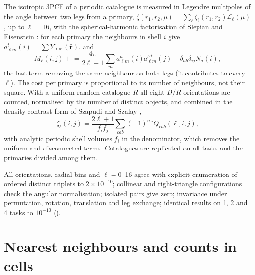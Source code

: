 The isotropic 3PCF of a periodic catalogue is measured in Legendre multipoles of the angle between two legs from a primary, $\zeta(r_1,r_2,\mu)=\sum_\ell
\zeta_\ell(r_1,r_2)\mathcal L_\ell(\mu)$, up to $\ell=16$, with the spherical-harmonic factorisation of Slepian and Eisenstein \cite{SlepianEisenstein2015}:
for each primary the neighbours in shell $i$ give $a^t_{\ell m}(i)=\sum Y_{\ell m}(\hat{\bm r})$, and
\begin{equation}
M_{\ell}(i,j)\mathrel{+}=\frac{4\pi}{2\ell+1}\sum_ma^a_{\ell m}(i)a^{b*}_{\ell m}(j)-\delta_{ab}\delta_{ij}N_a(i),
\end{equation}
the last term removing the same neighbour on both legs (it contributes to every $\ell$). The cost per primary is proportional to its number of neighbours,
not their square. With a uniform random catalogue $R$ all eight $D/R$ orientations are counted, normalised by the number of distinct objects, and combined
in the density-contrast form of Szapudi and Szalay \cite{SzapudiSzalay1998},
\begin{equation}
\zeta_\ell(i,j)=\frac{2\ell+1}{f_if_j}\sum_{cab}(-1)^{n_R}Q_{cab}(\ell,i,j),
\end{equation}
with analytic periodic shell volumes $f_i$ in the denominator, which removes the uniform and disconnected terms. Catalogues are replicated on all tasks and the
primaries divided among them.

\begin{validation}
All orientations, radial bins and $\ell=0$--16 agree with explicit enumeration of ordered distinct triplets to $2\times10^{-10}$; collinear and right-triangle
configurations check the angular normalisation; isolated pairs give zero; invariance under permutation, rotation, translation and leg exchange; identical results on
1, 2 and 4 tasks to $10^{-10}$ ().
\end{validation}

\section{Nearest neighbours and counts in cells}\label{sec:cs-cic}

